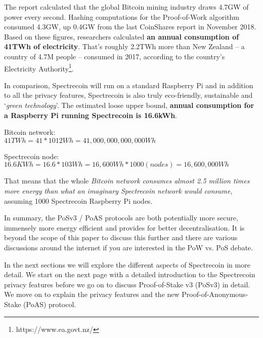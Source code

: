 The report calculated that the global Bitcoin mining industry draws 4.7GW of
power every second. Hashing computations for the Proof-of-Work algorithm
consumed 4.3GW, up 0.4GW from the last CoinShares report in November 2018.
Based on these figures, researchers calculated \textbf{an annual consumption of
41TWh of electricity}. That’s roughly 2.2TWh more than New Zealand – a country
of 4.7M people – consumed in 2017, according to the country’s Electricity
Authority\footnote{https://www.ea.govt.nz/}.



In comparison, Spectrecoin will run on a standard Raspberry Pi and in addition
to all the privacy features, Spectrecoin is also truly eco-friendly, sustainable
and ‘\textit{green technology}’. The estimated loose upper bound, \textbf{annual 
consumption for a Raspberry Pi running Spectrecoin is 16.6kWh}.

\vspace{5mm} %

Bitcoin network:\\
$41 TWh = 41*1012 Wh = 41,000,000,000,000 Wh$

\vspace{5mm} %

Spectrecoin node:\\
$16.6 KWh = 16.6 * 103 Wh = 16,600 Wh * 1000 (nodes) = 16,600,000 Wh$

\vspace{5mm} %

That means that the whole \textit{Bitcoin network consumes almost 2.5 million times
more energy than what an imaginary Spectrecoin network would consume}, assuming
1000 Spectrecoin Raspberry Pi nodes.




In summary, the PoSv3 / PoAS protocols are both potentially more secure,
immensely more energy efficient and provides for better decentralisation.
It is beyond the scope of this paper to discuss this further and there are
various discussions around the internet if you are interested in the PoW vs.
PoS debate.



In the next sections we will explore the different aspects of Spectrecoin in
more detail. We start on the next page with a detailed introduction to the
Spectrecoin privacy features before we go on to discuss Proof-of-Stake v3
(PoSv3) in detail. We move on to explain the privacy features and the new
Proof-of-Anonymous-Stake (PoAS) protocol.